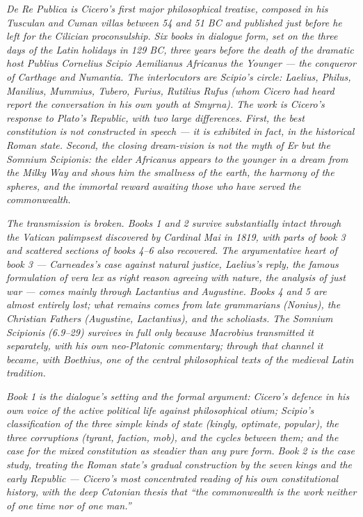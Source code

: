 
\textit{De Re Publica is Cicero's first major philosophical
treatise, composed in his Tusculan and Cuman villas between
54 and 51 BC and published just before he left for the
Cilician proconsulship. Six books in dialogue form, set on
the three days of the Latin holidays in 129 BC, three years
before the death of the dramatic host Publius Cornelius
Scipio Aemilianus Africanus the Younger --- the conqueror of
Carthage and Numantia. The interlocutors are Scipio's circle:
Laelius, Philus, Manilius, Mummius, Tubero, Furius, Rutilius
Rufus (whom Cicero had heard report the conversation in his
own youth at Smyrna). The work is Cicero's response to
Plato's \textit{Republic}, with two large differences. First,
the best constitution is not constructed in speech --- it
is exhibited in fact, in the historical Roman state. Second,
the closing dream-vision is not the myth of Er but the
Somnium Scipionis: the elder Africanus appears to the younger
in a dream from the Milky Way and shows him the smallness of
the earth, the harmony of the spheres, and the immortal
reward awaiting those who have served the commonwealth.}

\textit{The transmission is broken. Books 1 and 2 survive
substantially intact through the Vatican palimpsest discovered
by Cardinal Mai in 1819, with parts of book 3 and scattered
sections of books 4--6 also recovered. The argumentative
heart of book 3 --- Carneades's case against natural justice,
Laelius's reply, the famous formulation of \textit{vera lex}
as right reason agreeing with nature, the analysis of just
war --- comes mainly through Lactantius and Augustine. Books
4 and 5 are almost entirely lost; what remains comes from
late grammarians (Nonius), the Christian Fathers (Augustine,
Lactantius), and the scholiasts. The Somnium Scipionis (6.9--29)
survives in full only because Macrobius transmitted it
separately, with his own neo-Platonic commentary; through
that channel it became, with Boethius, one of the central
philosophical texts of the medieval Latin tradition.}

\textit{Book 1 is the dialogue's setting and the formal
argument: Cicero's defence in his own voice of the active
political life against philosophical \textit{otium}; Scipio's
classification of the three simple kinds of state (kingly,
optimate, popular), the three corruptions (tyrant, faction,
mob), and the cycles between them; and the case for the
mixed constitution as steadier than any pure form. Book 2
is the case study, treating the Roman state's gradual
construction by the seven kings and the early Republic ---
Cicero's most concentrated reading of his own constitutional
history, with the deep Catonian thesis that ``the
commonwealth is the work neither of one time nor of one
man.''}

